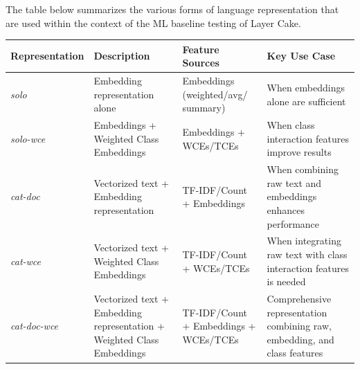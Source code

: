 \documentclass[final]{clv2025}
\begin{document}
The table below summarizes the various forms of language representation that are used within the context of the ML baseline testing of Layer Cake.
\sloppy
\begin{table}[h!]

\label{tab1}
\begin{tabularx}{\textwidth}{|l|X|X|X|}
\toprule
\textbf{Representation} & \textbf{Description} & \textbf{Feature Sources} & \textbf{Key Use Case} \\
\midrule
\textit{solo} & Embedding representation alone & Embeddings (weighted/avg/ summary) & When embeddings alone are sufficient \\
\textit{solo-wce} & Embeddings + Weighted Class Embeddings & Embeddings + WCEs/TCEs & When class interaction features improve results \\
\textit{cat-doc} & Vectorized text + Embedding representation & TF-IDF/Count + Embeddings & When combining raw text and embeddings enhances performance \\
\textit{cat-wce} & Vectorized text + Weighted Class Embeddings & TF-IDF/Count + WCEs/TCEs & When integrating raw text with class interaction features is needed \\
\textit{cat-doc-wce} & Vectorized text + Embedding representation + Weighted Class Embeddings & TF-IDF/Count + Embeddings + WCEs/TCEs & Comprehensive representation combining raw, embedding, and class features \\

\bottomrule
\end{tabularx}
\end{table}
\newpage
\end{document}
